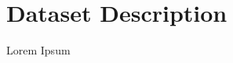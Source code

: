 \documentclass[main.tex]{subfiles}
\begin{document}
\section{Dataset Description}
Lorem Ipsum
\end{document}
